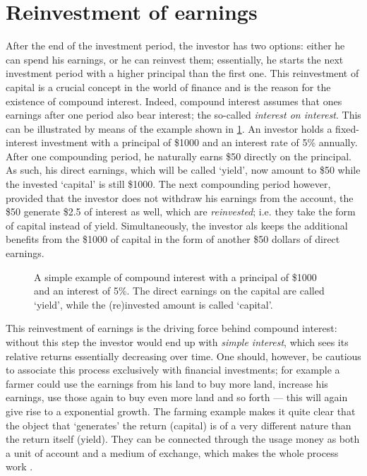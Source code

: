 \section{Reinvestment of earnings}
After the end of the investment period, the investor has two options: either he can spend his earnings, or he can reinvest them; essentially, he starts the next investment period with a higher principal than the first one. This reinvestment of capital is a crucial concept in the world of finance and is the reason for the existence of compound interest. Indeed, compound interest assumes that ones earnings after one period also bear interest; the so-called \emph{interest on interest}. This can be illustrated by means of the example shown in \cref{fig:compound_interest}. An investor holds a fixed-interest investment with a principal of \$1000 and an interest rate of 5\% annually. After one compounding period, he naturally earns \$50 directly on the principal. As such, his direct earnings, which will be called `yield', now amount to \$50 while the invested `capital' is still \$1000. The next compounding period however, provided that the investor does not withdraw his earnings from the account, the \$50 generate \$2.5 of interest as well, which are \emph{reinvested}; i.e. they take the form of capital instead of yield. Simultaneously, the investor als keeps the additional benefits from the \$1000 of capital in the form of another \$50 dollars of direct earnings.
\begin{figure}[h]
    \centering
    
    \caption{A simple example of compound interest with a principal of \$1000 and an interest of 5\%. The direct earnings on the capital are called `yield', while the (re)invested amount is called `capital'.}
    \label{fig:compound_interest}
\end{figure}
This reinvestment of earnings is the driving force behind compound interest: without this step the investor would end up with \emph{simple interest}, which sees its relative returns essentially decreasing over time. One should, however, be cautious to associate this process exclusively with financial investments; for example a farmer could use the earnings from his land to buy more land, increase his earnings, use those again to buy even more land and so forth --- this will again give rise to a exponential growth. The farming example makes it quite clear that the object that `generates' the return (capital) is of a very different nature than the return itself (yield). They can be connected through the usage money as both a unit of account and a medium of exchange, which makes the whole process work \cite{Mankiw2017}. 

